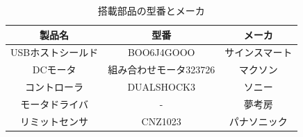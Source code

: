 \begin{table}[!htb]
 \begin{center}
  \caption{搭載部品の型番とメーカ}
  \begin{tabular}[htbp]{|c|c|c|}
   \hline
   製品名&型番&メーカ \\
   \hline
   USBホストシールド&BOO6J4GOOO&サインスマート\\
   \hline
   DCモータ&組み合わせモータ323726&マクソン\\
   \hline
   コントローラ&DUALSHOCK3&ソニー\\
   \hline
   モータドライバ&-&夢考房\\
   \hline
   リミットセンサ&CNZ1023&パナソニック\\
   \hline
  \end{tabular}
  \label{tab:parts}
 \end{center}
\end{table}